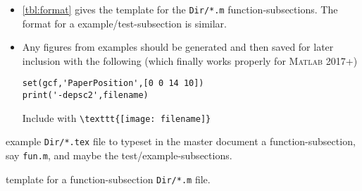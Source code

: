 \begin{itemize}
\item \autoref{tbl:format} gives the template for the \verb|Dir/*.m| function-subsections.
The format for a example\slash test-subsection is similar.


\item Any figures from examples should be generated and then saved for later inclusion with the following (which finally works properly for \textsc{Matlab} 2017+)
\begin{verbatim}
set(gcf,'PaperPosition',[0 0 14 10])
print('-depsc2',filename)
\end{verbatim}
Include with \quad \verb|\texttt{[image: filename]}|

\end{itemize}


\begin{table}
\caption{\label{tbl:funtex}example \texttt{Dir/*.tex} file to typeset in the master document a function-subsection, say \texttt{fun.m}, and maybe the test\slash example-subsections.}
\end{table}
\begin{table}
\caption{\label{tbl:format}template for a function-subsection \texttt{Dir/*.m} file.}
\end{table}


